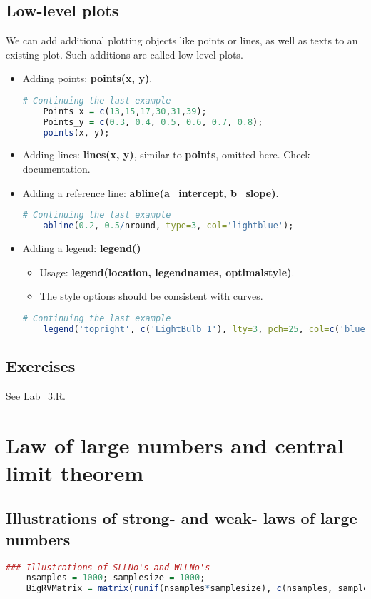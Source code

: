 \documentclass[10pt]{article}
\begin{document}
\subsection{Low-level plots}
We can add additional plotting objects like points or lines, as well as texts to an existing plot. Such additions are called low-level plots.
\begin{itemize}
	\item Adding points: {\bf points(x, y)}.
\begin{lstlisting}[style=displaycode, language=R]
	# Continuing the last example
	Points_x = c(13,15,17,30,31,39);
	Points_y = c(0.3, 0.4, 0.5, 0.6, 0.7, 0.8);
	points(x, y);
\end{lstlisting}
	\item Adding lines: {\bf lines(x, y)}, similar to {\bf points}, omitted here. Check documentation.
	\item Adding a reference line: {\bf abline(a=intercept, b=slope)}.
\begin{lstlisting}[style=displaycode, language=R]
	# Continuing the last example
	abline(0.2, 0.5/nround, type=3, col='lightblue');
\end{lstlisting}
	\item Adding a legend: {\bf legend()}
	\begin{itemize}
		\item Usage: {\bf legend(location, legendnames, optimalstyle)}.
		\item The style options should be consistent with curves.
	\end{itemize}
\begin{lstlisting}[style=displaycode, language=R]
	# Continuing the last example
	legend('topright', c('LightBulb 1'), lty=3, pch=25, col=c('blue'));
\end{lstlisting}
\end{itemize}


\subsection{Exercises}
See Lab\_3.R.


\section{Law of large numbers and central limit theorem}

\subsection{Illustrations of strong- and weak- laws of large numbers}
\begin{lstlisting}[style=displaycode, language=R]
	### Illustrations of SLLNo's and WLLNo's
	nsamples = 1000; samplesize = 1000;
	BigRVMatrix = matrix(runif(nsamples*samplesize), c(nsamples, samplesize));
\end{lstlisting}
\end{document}
